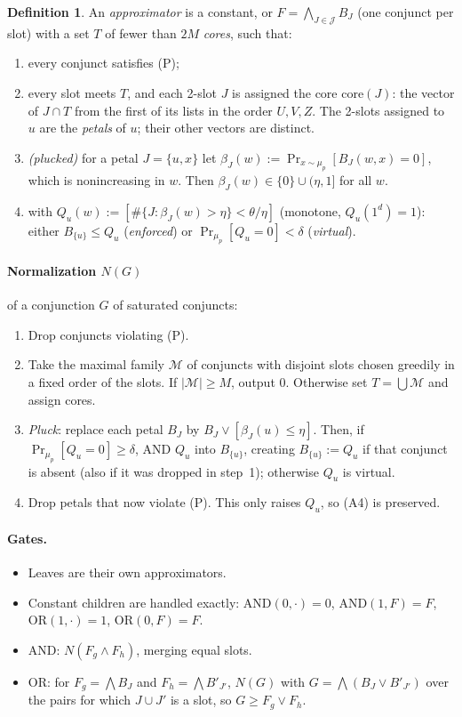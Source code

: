 \documentclass[11pt,a4paper]{article}
\theoremstyle{plain}
\theoremstyle{definition}
\newtheorem{definition}[theorem]{Definition}
\theoremstyle{remark}
\newcommand{\ones}{1^d}
\newcommand{\core}{\mathrm{core}}
\begin{document}
\begin{definition}\label{def:approx}
An \emph{approximator} is a constant, or $F=\bigwedge_{J\in\mathcal J}B_J$ (one conjunct per slot) with a set $T$ of
fewer than $2M$ \emph{cores}, such that:
\begin{enumerate}[label=(A\arabic*)]
  \item every conjunct satisfies (P);
  \item every slot meets $T$, and each 2-slot $J$ is assigned the core $\core(J)$: the vector of $J\cap T$ from the
    first of its lists in the order $U,V,Z$. The 2-slots assigned to $u$ are
    the \emph{petals} of $u$; their other vectors are distinct.
  \item \emph{(plucked)} for a petal $J=\{u,x\}$ let $\beta_J(w):=\Pr_{x\sim\mu_p}[B_J(w,x)=0]$, which is
    nonincreasing in $w$. Then $\beta_J(w)\in\{0\}\cup(\eta,1]$ for all $w$.
  \item with $Q_u(w):=[\#\{J:\beta_J(w)>\eta\}<\theta/\eta]$ (monotone, $Q_u(\ones)=1$): either $B_{\{u\}}\le Q_u$
    (\emph{enforced}) or $\Pr_{\mu_p}[Q_u=0]<\delta$ (\emph{virtual}).
\end{enumerate}
\end{definition}

\paragraph{Normalization $N(G)$} of a conjunction $G$ of saturated conjuncts:
\begin{enumerate}
  \item Drop conjuncts violating (P).
  \item Take the maximal family $\mathcal M$ of conjuncts with disjoint slots chosen greedily in a fixed order of the
    slots. If $|\mathcal M|\ge M$, output 0.
    Otherwise set $T=\bigcup\mathcal M$ and assign cores.
  \item \emph{Pluck}: replace each petal $B_J$ by $B_J\vee[\beta_J(u)\le\eta]$. Then, if
    $\Pr_{\mu_p}[Q_u=0]\ge\delta$, AND $Q_u$ into $B_{\{u\}}$, creating $B_{\{u\}}:=Q_u$ if that conjunct is absent
    (also if it was dropped in step~1); otherwise $Q_u$ is virtual.
  \item Drop petals that now violate (P). This only raises $Q_u$, so (A4) is preserved.
\end{enumerate}

\paragraph{Gates.}
\begin{itemize}
  \item Leaves are their own approximators.
  \item Constant children are handled exactly: $\mathrm{AND}(0,\cdot)=0$, $\mathrm{AND}(1,F)=F$,
    $\mathrm{OR}(1,\cdot)=1$, $\mathrm{OR}(0,F)=F$.
  \item AND: $N(F_g\wedge F_h)$, merging equal slots.
  \item OR: for $F_g=\bigwedge B_J$ and $F_h=\bigwedge B'_{J'}$, $N(G)$ with $G=\bigwedge(B_J\vee B'_{J'})$ over the
    pairs for which $J\cup J'$ is a slot, so
    $G\ge F_g\vee F_h$.
\end{itemize}
\end{document}

